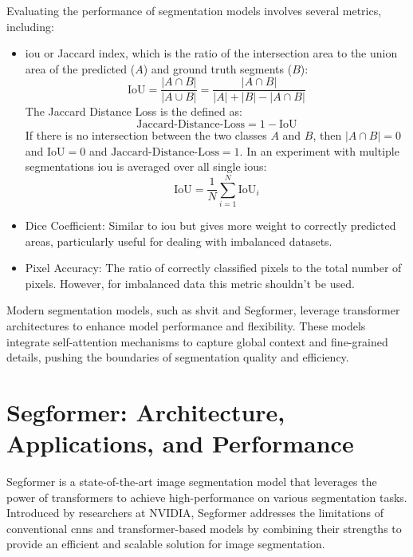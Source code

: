 Evaluating the performance of segmentation models involves several metrics, including:
\begin{itemize}
	\item \gls{iou} or Jaccard index, which is the ratio of the intersection area to the union area of the predicted ($A$) and ground truth segments ($B$): 
	\begin{equation}
		\text{IoU} = \frac{\left| A \cap B \right|}{\left| A \cup B \right|} = \frac{\left| A \cap B \right|}{\left| A \right| + \left| B \right| - \left| A \cap B \right|}
	\end{equation}
	The Jaccard Distance Loss is the defined as: 
	\begin{equation}
		\text{Jaccard-Distance-Loss} = 1 - \text{IoU}
	\end{equation} If there is no intersection between the two classes $A$ and $B$, then $\left| A \cap B \right| = 0$ and $\text{IoU}=0$ and $\text{Jaccard-Distance-Loss} = 1$. In an experiment with multiple segmentations \gls{iou}  is averaged over all single \glspl{iou}: 
	\begin{equation}
		\text{IoU} = \frac{1}{N} \sum_{i=1}^N \text{IoU}_i
	\end{equation}
	\item Dice Coefficient: Similar to \gls{iou} but gives more weight to correctly predicted areas, particularly useful for dealing with imbalanced datasets. 
	\item Pixel Accuracy: The ratio of correctly classified pixels to the total number of pixels. However, for imbalanced data this metric shouldn't be used.
\end{itemize}

Modern segmentation models, such as \gls{shvit} and Segformer, leverage transformer architectures to enhance model performance and flexibility. These models integrate self-attention mechanisms to capture global context and fine-grained details, pushing the boundaries of segmentation quality and efficiency.


\section{Segformer: Architecture, Applications, and Performance}
Segformer is a state-of-the-art image segmentation model that leverages the power of transformers to achieve high-performance on various segmentation tasks. Introduced by researchers at NVIDIA, Segformer addresses the limitations of conventional \glspl{cnn} and transformer-based models by combining their strengths to provide an efficient and scalable solution for image segmentation.

